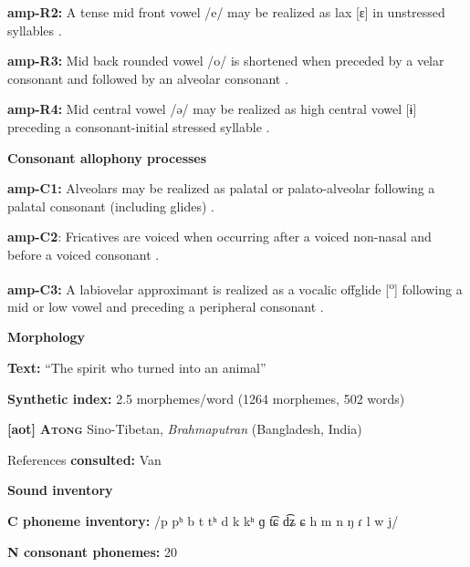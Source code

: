 \textbf{amp-R2:} A tense mid front vowel /e/ may be realized as lax [ɛ] in unstressed syllables \citep[38]{Bruce1984}.



\textbf{amp-R3:} Mid back rounded vowel /o/ is shortened when preceded by a velar consonant and followed by an alveolar consonant \citep[39]{Bruce1984}.



\textbf{amp-R4:} Mid central vowel /ə/ may be realized as high central vowel [ɨ] preceding a consonant-initial stressed syllable \citep[41]{Bruce1984}.



\textbf{Consonant allophony processes}



\textbf{amp-C1:} Alveolars may be realized as palatal or palato-alveolar following a palatal consonant (including glides) \citep[29]{Bruce1984}.



\textbf{amp-C2}: Fricatives are voiced when occurring after a voiced non-nasal and before a voiced consonant \citep[25]{Bruce1984}.



\textbf{amp-C3:} A labiovelar approximant is realized as a vocalic offglide [\textsuperscript{o}] following a mid or low vowel and preceding a peripheral consonant \citep[28]{Bruce1984}.



\textbf{Morphology}



\textbf{Text:} “The spirit who turned into an animal” \citep[323-331]{Bruce1984}



\textbf{Synthetic index:} 2.5 morphemes/word (1264 morphemes, 502 words)



\textbf{[aot]}   \textbf{\textsc{Atong}  }  Sino-Tibetan, \textit{Brahmaputran} (Bangladesh, India)



References \textbf{consulted:} Van \citet{Breugel2008}



\textbf{Sound inventory}



\textbf{C phoneme inventory:} /p pʰ b t tʰ d k kʰ ɡ t͡ɕ d͡ʑ ɕ h m n ŋ ɾ l w j/



\textbf{N consonant phonemes:} 20



